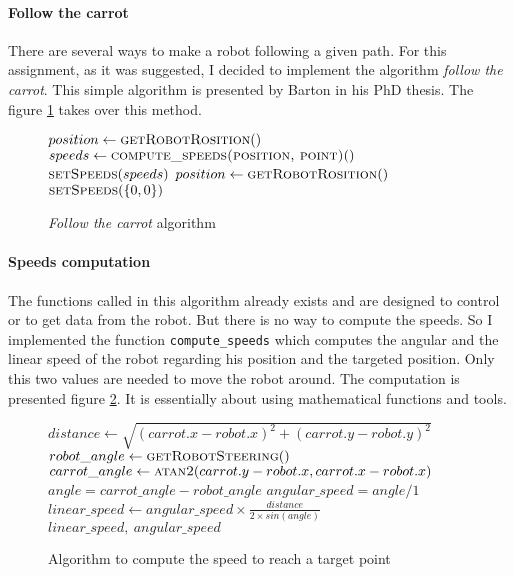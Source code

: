\paragraph{Follow the carrot}{
    There are several ways to make a robot following a given path. For this
assignment, as it was suggested, I decided to implement the algorithm
\textit{follow the carrot}. This simple algorithm is presented by Barton in
his PhD thesis\cite{thesis:barton}. The figure \ref{algo:base} takes over
this method.
}

\begin{figure}[h!]
    \begin{algorithmic}
            \State $position \gets \Call{getRobotRosition}$
                \State $speeds \gets \Call{compute\_speeds(position, point)}$
                \State $\Call{setSpeeds}{speeds}$
                \State $position \gets \Call{getRobotRosition}$
            \EndWhile
        \EndFor
        \State $\Call{setSpeeds}{\{0, 0\}}$
    \end{algorithmic}
    
    \caption{
        \label{algo:base}
        \textit{Follow the carrot} algorithm
    }
\end{figure}

\paragraph{Speeds computation}{
    The functions called in this algorithm already exists and are designed to
control or to get data from the robot. But there is no way to compute the speeds. So I implemented the function \texttt{compute\_speeds} which computes
the angular and the linear speed of the robot regarding his position and the
targeted position. Only this two values are needed to move the robot around.
The computation is presented figure \ref{algo:speeds}. It is essentially about
using mathematical functions and tools.
}

\begin{figure}[!h]
    \begin{algorithmic}
        \State $distance \gets \sqrt{(carrot.x - robot.x)^{2} + (carrot.y - robot.y)^{2}}$
        \State $robot\_angle \gets \Call{getRobotSteering}$
        \State $carrot\_angle \gets \Call{atan2}{carrot.y - robot.x, carrot.x - robot.x}$
        \State $angle = carrot\_angle - robot\_angle$
        \State $angular\_speed = angle / 1$
        \State $linear\_speed \gets angular\_speed \times \frac{distance}{2 \times sin( angle )} $
        \State \Return $linear\_speed,~angular\_speed$
     \EndFunction
    \end{algorithmic}
    
    \caption{
        \label{algo:speeds}
        Algorithm to compute the speed to reach a target point
    }
\end{figure}

